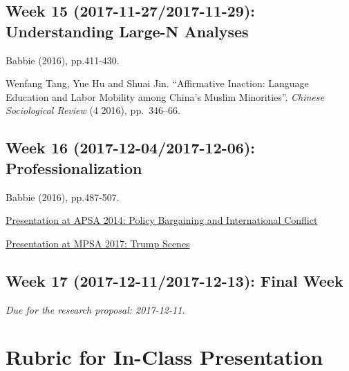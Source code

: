 \documentclass[11pt,]{article}
\theoremstyle{definition}
\theoremstyle{definition}
\theoremstyle{remark}
\begin{document}
\subsection{Week 15 (2017-11-27/2017-11-29): Understanding Large-N
Analyses}\label{week-15-2017-11-272017-11-29-understanding-large-n-analyses}

Babbie (2016), pp.411-430.

Wenfang Tang, Yue Hu and Shuai Jin. ``Affirmative Inaction: Language
Education and Labor Mobility among China's Muslim Minorities''.
\emph{Chinese Sociological Review} (4 2016), pp.~346--66.

\subsection{Week 16 (2017-12-04/2017-12-06):
Professionalization}\label{week-16-2017-12-042017-12-06-professionalization}

Babbie (2016), pp.487-507.

\href{https://www.youtube.com/watch?v=bwNBXuz2eRg}{Presentation at APSA
2014: Policy Bargaining and International Conflict}

\href{https://www.youtube.com/watch?v=Z4ISkF2H4tk}{Presentation at MPSA
2017: Trump Scenes}

\subsection{Week 17 (2017-12-11/2017-12-13): Final
Week}\label{week-17-2017-12-112017-12-13-final-week}

\emph{Due for the research proposal: 2017-12-11.}

\clearpage

\hypertarget{id}{\section{Rubric for In-Class Presentation}\label{id}}
\end{document}
